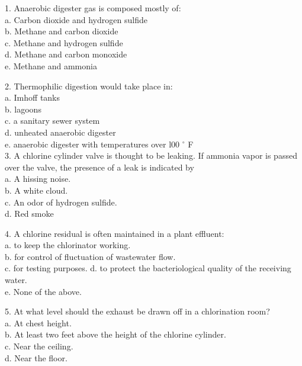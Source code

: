 1. Anaerobic digester gas is composed mostly of:\\

a. Carbon dioxide and hydrogen sulfide \\
b. Methane and carbon dioxide \\
c. Methane and hydrogen sulfide \\
d. Methane and carbon monoxide \\
e. Methane and ammonia \\
\vspace{0.3cm}

2. Thermophilic digestion would take place in:\\

a. Imhoff tanks \\
b. lagoons \\
c. a sanitary sewer system \\
d. unheated anaerobic digester \\
e. anaerobic digester with temperatures over l00 $^\circ$ F \\

\vspace{0.3cm}
3. A chlorine cylinder valve is thought to be leaking. If ammonia vapor is passed over the valve, the presence of a leak is indicated by\\

a. A hissing noise. \\
b. A white cloud.\\ 
c. An odor of hydrogen sulfide. \\
d. Red smoke \\
\vspace{0.3cm}

4. A chlorine residual is often maintained in a plant effluent:\\

a. to keep the chlorinator working. \\
b. for control of fluctuation of wastewater flow. \\
c. for testing purposes. 
d. to protect the bacteriological quality of the receiving water. \\
e. None of the above. \\
\vspace{0.3cm}

5. At what level should the exhaust be drawn off in a chlorination room?\\

a. At chest height. \\
b. At least two feet above the height of the chlorine cylinder. \\
c. Near the ceiling. \\
d. Near the floor. \\

